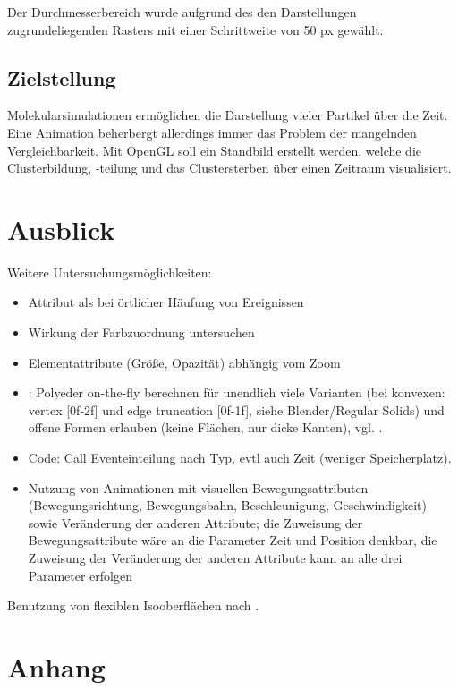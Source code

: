 Der Durchmesserbereich wurde aufgrund des den Darstellungen zugrundeliegenden Rasters mit einer Schrittweite von 50 \gls{px} gewählt.

\section{Zielstellung}
Molekularsimulationen ermöglichen die Darstellung vieler Partikel über die Zeit. Eine Animation beherbergt allerdings immer das Problem der mangelnden Vergleichbarkeit.
Mit OpenGL soll ein Standbild erstellt werden, welche die Clusterbildung, -teilung und das Clustersterben über einen Zeitraum visualisiert.


\chapter{Ausblick}
Weitere Untersuchungsmöglichkeiten:
\begin{itemize}
	\item Attribut  als  bei örtlicher Häufung von Ereignissen
	\item Wirkung der Farbzuordnung untersuchen
	\item Elementattribute (Größe, Opazität) abhängig vom Zoom
	\item {}: Polyeder on-the-fly berechnen für unendlich viele Varianten (bei konvexen: vertex [0f-2f] und edge truncation [0f-1f], siehe Blender/Regular Solids) und offene Formen erlauben (keine Flächen, nur dicke Kanten), vgl. \cite{WebGLUniformPolyhedra}.
	\item Code: Call Eventeinteilung nach Typ, evtl auch Zeit (weniger Speicherplatz).
	\item Nutzung von Animationen mit visuellen Bewegungsattributen (Bewegungsrichtung, Bewegungsbahn, Beschleunigung, Geschwindigkeit) sowie Veränderung der anderen Attribute; die Zuweisung der Bewegungsattribute wäre an die Parameter Zeit und Position denkbar, die Zuweisung der Veränderung der anderen Attribute kann an alle drei Parameter erfolgen
\end{itemize}

Benutzung von flexiblen Isooberflächen nach \cite{carr2010flexibleIsosurfaces}.


\appendix

\chapter{Anhang}

